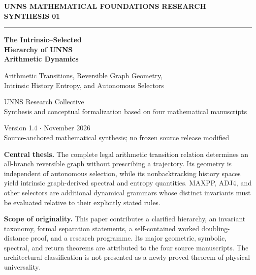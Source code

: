 \documentclass[11pt,a4paper]{article}
\theoremstyle{definition}\newtheorem{definition}[theorem]{Definition}
\begin{document}
\begin{titlepage}
\thispagestyle{empty}
\vspace*{13mm}
{\color{tealdark}\sffamily\bfseries\large UNNS MATHEMATICAL FOUNDATIONS \hfill RESEARCH SYNTHESIS 01}\par
\vspace{7mm}\noindent\color{ochre}\rule{\textwidth}{1.8pt}\par
\vspace{23mm}
{\color{ink}\Huge\bfseries The Intrinsic--Selected\\[5pt] Hierarchy of UNNS\\[5pt] Arithmetic Dynamics\par}
\vspace{13mm}
{\color{tealdark}\Large Arithmetic Transitions, Reversible Graph Geometry,\\ Intrinsic History Entropy, and Autonomous Selectors\par}
\vspace{20mm}
{\large UNNS Research Collective\\[5pt]\normalsize Synthesis and conceptual formalization based on four mathematical manuscripts\par}
\vspace{11mm}
{\color{slate}Version 1.4 \quad $\cdot$  November 2026\\ Source-anchored mathematical synthesis; no frozen source release modified\par}
\vfill
\begin{takeaway}
\textbf{Central thesis.} The complete legal arithmetic transition relation determines an all-branch reversible graph without prescribing a trajectory. Its geometry is independent of autonomous selection, while its nonbacktracking history spaces yield intrinsic graph-derived spectral and entropy quantities. MAXPP, ADJ4, and other selectors are additional dynamical grammars whose distinct invariants must be evaluated relative to their explicitly stated rules.
\end{takeaway}
\vspace{9mm}
\noindent\small\textbf{Scope of originality.} This paper contributes a clarified hierarchy, an invariant taxonomy, formal separation statements, a self-contained worked doubling-distance proof, and a research programme. Its major geometric, symbolic, spectral, and return theorems are attributed to the four source manuscripts. The architectural classification is not presented as a newly proved theorem of physical universality.\par
\end{titlepage}
\end{document}
